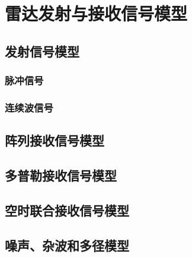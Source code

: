\chapter{雷达发射与接收信号模型}

\section{发射信号模型}

\subsection{脉冲信号}

\subsection{连续波信号}

\section{阵列接收信号模型}

\section{多普勒接收信号模型}

\section{空时联合接收信号模型}

\section{噪声、杂波和多径模型}